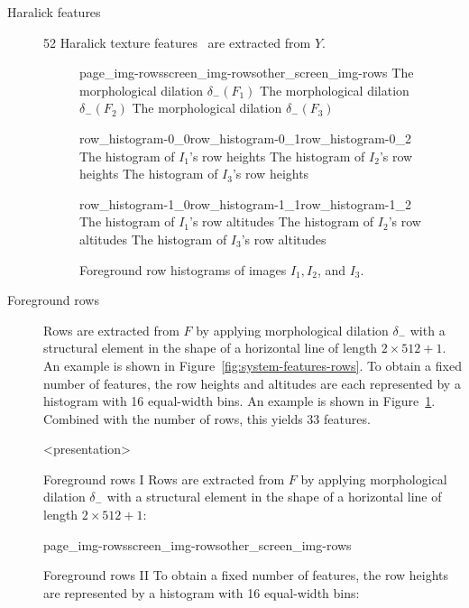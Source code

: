 \begin{description}
  \item[Haralick features]
    52 Haralick texture features~\cite{haralick1973textural} are extracted from $Y$.

  \begin{figure}
      {page_img-rows}{screen_img-rows}{other_screen_img-rows}%
      {The morphological dilation $\delta_{{}-{}}(F_1)$}%
      {The morphological dilation $\delta_{{}-{}}(F_2)$}%
      {The morphological dilation $\delta_{{}-{}}(F_3)$}
    \caption{Foreground rows of images $I_1,I_2$, and $I_3$.}
    \label{fig:system-features-rows}

    \kern\floatsep
    {\setlength{\fboxrule}{0pt}%
       {row_histogram-0_0}{row_histogram-0_1}{row_histogram-0_2}%
       {The histogram of $I_1$'s row heights}%
       {The histogram of $I_2$'s row heights}%
       {The histogram of $I_3$'s row heights}\par
       {row_histogram-1_0}{row_histogram-1_1}{row_histogram-1_2}%
       {The histogram of $I_1$'s row altitudes}%
       {The histogram of $I_2$'s row altitudes}%
       {The histogram of $I_3$'s row altitudes}}
    \caption{Foreground row histograms of images $I_1,I_2$, and $I_3$.}
    \label{fig:system-features-row-histograms}
  \end{figure}
  \item[Foreground rows]
    Rows are extracted from $F$ by applying morphological dilation $\delta_{{}-{}}$ with
    a structural element in the shape of a horizontal line of length $2\times
    512+1$. An example is shown in Figure~\ref{fig:system-features-rows}.
    To obtain a fixed number of features, the row heights and altitudes are each
    represented by a histogram with 16 equal-width bins. An example is shown in
    Figure~\ref{fig:system-features-row-histograms}. Combined with the number
    of rows, this yields 33 features.

\mode
<presentation>

  \begin{frame}{Foreground rows I}
    Rows are extracted from $F$ by applying morphological dilation
    $\delta_{{}-{}}$ with a structural element in the shape of a horizontal
    line of length $2\times 512+1$:

      {page_img-rows}{screen_img-rows}{other_screen_img-rows}%
  \end{frame}
  \begin{frame}{Foreground rows II}
    To obtain a fixed number of features, the row heights are represented by a
    histogram with 16 equal-width bins:


\end{frame}
\end{description}
